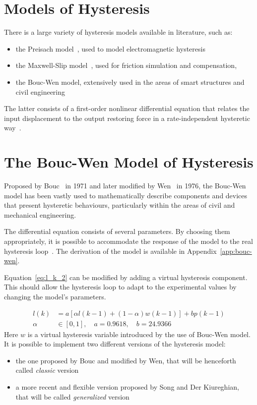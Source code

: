 \section{Models of Hysteresis}

There is a large variety of hysteresis models available in literature,
such as:

\begin{itemize}[noitemsep]
	\item the Preisach model~\cite{preisach}, used to model electromagnetic hysteresis
	\item the Maxwell-Slip model~\cite{maxwell-slip}, used for friction simulation and compensation,
	\item the Bouc-Wen model, extensively used in the areas of smart structures
	and civil engineering~\cite{bouc_wen}
\end{itemize}

The latter consists of a first-order nonlinear differential equation that relates
the input displacement to the output restoring force
in a rate-independent hysteretic way~\cite{krasnosel2012systems}.

\section{The Bouc-Wen Model of Hysteresis}

Proposed by Bouc~\cite{bouc} in 1971 and later modified by Wen~\cite{bouc_wen} in 1976,
the Bouc-Wen model has been vastly used to mathematically describe components and devices
that present hysteretic behaviours, particularly within
the areas of civil and mechanical engineering.

The differential equation consists of several parameters. By choosing them appropriately,
it is possible to accommodate the response of the model to the real hysteresis
loop~\cite{ismail2009hysteresis}.
The derivation of the model is available in Appendix~\ref{app:bouc-wen}.

Equation~\ref{eq:l_k_2} can be modified by adding a virtual hysteresis component.
This should allow the hysteresis loop to adapt to the experimental values by changing
the model's parameters.

\begin{align}
\label{eq:l_w}
l(k) &= a \left [\alpha l(k-1) + (1-\alpha)w(k-1) \right] + bp(k-1) \\
\alpha &\in \left[0,1\right],\quad a = 0.9618, \quad b=24.9366 \nonumber
\end{align}
Here $w$ is a virtual hysteresis variable introduced by the use of Bouc-Wen model.
It is possible to implement two different versions of the hysteresis model:
\begin{itemize}[noitemsep]
	\item the one proposed by Bouc and modified by Wen, that will be henceforth called \textit{classic} version
	\item a more recent and flexible version proposed by Song and Der Kiureghian, that will be called \textit{generalized} version
\end{itemize}

